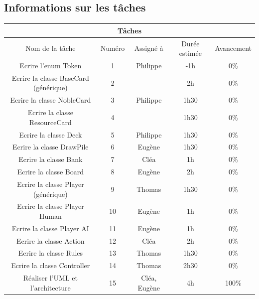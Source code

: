 \documentclass[12pt, letterpaper]{article}
\begin{document}
\subsection{Informations sur les tâches}
\begin{center}
\begin{tabular}{ |c||c||c|c|c| }
\hline
\multicolumn{5}{|c|}{Tâches} \\
\hline
Nom de la tâche & Numéro & Assigné à & Durée estimée & Avancement\\
\hline
\hline
Ecrire l'enum Token & 1 & Philippe & -1h & 0\%\\
\hline
Ecrire la classe BaseCard (générique) & 2 & & 2h & 0\%\\
Ecrire la classe NobleCard & 3 & Philippe & 1h30 & 0\%\\
Ecrire la classe ResourceCard & 4 & & 1h30 & 0\%\\
\hline
Ecrire la classe Deck & 5 & Philippe & 1h30 & 0\%\\
\hline
Ecrire la classe DrawPile & 6 & Eugène & 1h30 & 0\%\\
\hline
Ecrire la classe Bank & 7 & Cléa & 1h & 0\%\\
\hline
Ecrire la classe Board & 8 & Eugène & 2h & 0\%\\
\hline
Ecrire la classe Player (générique) & 9 & Thomas & 1h30 & 0\%\\
Ecrire la classe Player Human & 10 & Eugène & 1h & 0\%\\
Ecrire la classe Player AI & 11 & Eugène & 1h & 0\%\\
\hline
Ecrire la classe Action & 12 & Cléa & 2h & 0\%\\
\hline
Ecrire la classe Rules & 13 & Thomas & 1h30 & 0\%\\
\hline
Ecrire la classe Controller & 14 & Thomas & 2h30 & 0\%\\
\hline
Réaliser l'UML et l'architecture & 15 & Cléa, Eugène & 4h & \cellcolor[HTML]{a5ee7d} 100\%\\
\hline
\end{tabular}
\end{center}
\end{document}
